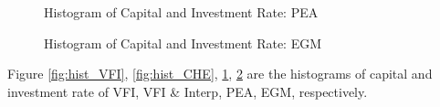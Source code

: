 \documentclass{article}
\begin{document}
	\begin{figure}[H]
		\centering
		\caption{Histogram of Capital and Investment Rate: PEA}
		\label{fig:hist_PEA}
	\end{figure}
	
	\begin{figure}[H]
		\centering
		\caption{Histogram of Capital and Investment Rate: EGM}
		\label{fig:hist_EGM}
	\end{figure}
	Figure \ref{fig:hist_VFI}, \ref{fig:hist_CHE}, \ref{fig:hist_PEA}, \ref{fig:hist_EGM} are the histograms of capital and investment rate of VFI, VFI \& Interp, PEA, EGM, respectively.
	
\end{document}

